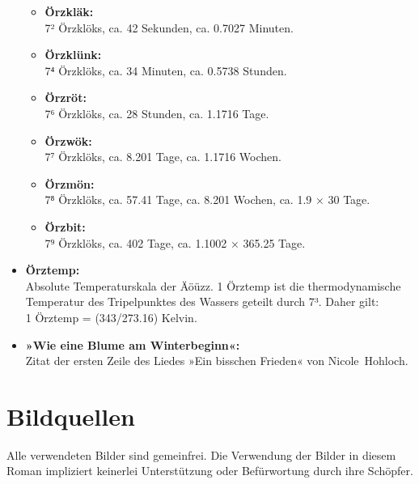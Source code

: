\begin{itemize}
    \begin{itemize}
        \item \textbf{Örzkläk:}\\ 7² Örzklöks, ca. 42 Sekunden, ca. 0.7027 Minuten.
        \item \textbf{Örzklünk:}\\ 7⁴ Örzklöks, ca. 34 Minuten, ca. 0.5738 Stunden.
        \item \textbf{Örzröt:}\\ 7⁶ Örzklöks, ca. 28 Stunden, ca. 1.1716 Tage.
        \item \textbf{Örzwök:}\\ 7⁷ Örzklöks, ca. 8.201 Tage, ca. 1.1716 Wochen.
        \item \textbf{Örzmön:}\\ 7⁸ Örzklöks, ca. 57.41 Tage, ca. 8.201 Wochen, ca. 1.9 × 30 Tage.
        \item \textbf{Örzbit:}\\ 7⁹ Örzklöks, ca. 402 Tage, ca. 1.1002 × 365.25 Tage.
    \end{itemize}
    \item \textbf{Örztemp:}\\ Absolute Temperaturskala der Äöüzz. 1 Örztemp ist die thermodynamische Temperatur des Tripelpunktes des Wassers geteilt durch 7³. Daher gilt:\\ 1 Örztemp = (343/273.16) Kelvin.
    \item \textbf{»Wie eine Blume am Winterbeginn«:}\\ Zitat der ersten Zeile des Liedes »Ein bisschen Frieden« von Nicole~Hohloch.
\end{itemize}


\chapter{Bildquellen}

Alle verwendeten Bilder sind gemeinfrei. Die Verwendung der Bilder in diesem Roman impliziert keinerlei Unterstützung oder Befürwortung durch ihre Schöpfer.

